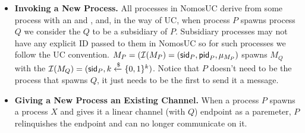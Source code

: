 \begin{itemize}
	\item {\bf Invoking a New Process.} 
		All processes in NomosUC derive from some process with an \sid and \pid, and, in the way of UC, when process $P$ spawns process $Q$ we consider the $Q$ to be a subsidiary of $P$.
		Subsidiary processes may not have any explicit ID passed to them in NomosUC so for such processes we follow the UC convention.
		$M_P = (\mathcal{I}(M_P) = ({\mathsf {sid}}_P, {\mathsf {pid}}_P, \mu_{M_P})$ spawns $M_Q$ with the $\mathcal{I}(M_Q) = ({\mathsf {sid}}_P, k \xleftarrow{\$} \{0,1\}^k)$.
		Notice that $P$ doesn't need to be the process that spawns $Q$, it just needs to be the first to send it a message.
	\item {\bf Giving a New Process an Existing Channel.} 
		When a process $P$ spawns a process $X$ and gives it a linear channel (with $Q$) endpoint as a paremeter, $P$ relinquishes the endpoint and can no longer communicate on it. 

\end{itemize}

